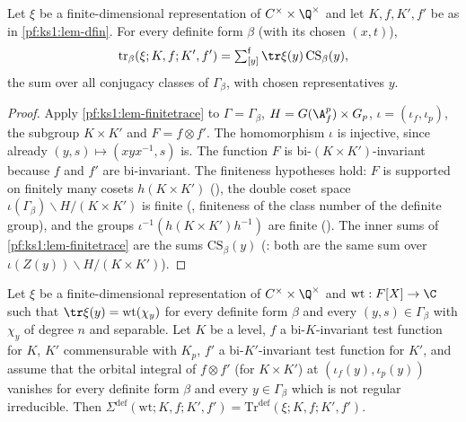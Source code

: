 \begin{lemma}\label{pf:ks1:lem-dtrace}
Let $\xi$ be a finite-dimensional representation of $C^\times\times\Q^\times$ and let $K,f,K',f'$ be as in \cref{pf:ks1:lem-dfin}. For every definite form
$\beta$ (with its chosen $(x,t)$),
\[\mathrm{tr}_\beta(\xi;K,f;K',f')=\ksonefs_{[y]}\tr\xi(y)\,\mathrm{CS}_\beta(y),\]
the sum over all conjugacy classes of $\Gamma_\beta$, with chosen representatives $y$.
\end{lemma}

\begin{proof}
Apply \cref{pf:ks1:lem-finitetrace} to $\Gamma=\Gamma_\beta$, $H=G(\ksoneAfp)\times G_p$, $\iota=(\iota_f,\iota_p)$, the subgroup $K\times K'$ and
$F=f\otimes f'$. The homomorphism $\iota$ is injective, since already $(y,s)\mapsto(xyx^{-1},s)$ is. The function $F$ is bi-$(K\times K')$-invariant
because $f$ and $f'$ are bi-invariant. The finiteness hypotheses hold: $F$ is supported on finitely many cosets $h(K\times K')$
(), the double coset space $\iota(\Gamma_\beta)\backslash H/(K\times K')$ is finite
(, finiteness of the class number of the definite group), and the groups
$\iota^{-1}(h(K\times K')h^{-1})$ are finite (). The inner sums of
\cref{pf:ks1:lem-finitetrace} are the sums $\mathrm{CS}_\beta(y)$ (: both are the same sum over
$\iota(Z(y))\backslash H/(K\times K')$).
\end{proof}

\begin{proposition}\label{pf:ks1:prop-h2}
Let $\xi$ be a finite-dimensional representation of $C^\times\times\Q^\times$ and $\mathrm{wt}:F[X]\to\C$ such that
$\tr\xi(y)=\mathrm{wt}(\chi_y)$ for every definite form $\beta$ and every $(y,s)\in\Gamma_\beta$ with $\chi_y$ of degree $n$ and
separable. Let $K$ be a level, $f$ a bi-$K$-invariant test function for $K$, $K'$ commensurable with $K_p$, $f'$ a bi-$K'$-invariant
test function for $K'$, and assume that the orbital integral of $f\otimes f'$ (for $K\times K'$) at $(\iota_f(y),\iota_p(y))$ vanishes
for every definite form $\beta$ and every $y\in\Gamma_\beta$ which is not regular irreducible. Then
$\Sigma^{\mathrm{def}}(\mathrm{wt};K,f;K',f')=\mathrm{Tr}^{\mathrm{def}}(\xi;K,f;K',f')$.
\end{proposition}

